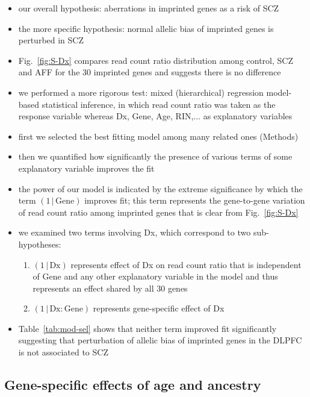 \documentclass[letterpaper]{article}
\begin{document}
\begin{itemize}
\item our overall hypothesis: aberrations in imprinted genes as a risk of
SCZ
\item the more specific hypothesis: normal allelic bias of imprinted genes is perturbed in SCZ
\item Fig.~\ref{fig:S-Dx} compares read count ratio distribution among
control, SCZ and AFF for the 30 imprinted genes and suggests there is no difference
\item we performed a more rigorous test: mixed (hierarchical) regression
model-based statistical inference,
in which read count ratio was taken as the response variable whereas Dx, Gene, Age, RIN,... as
explanatory variables
\item first we selected the best fitting model among many related ones (Methods)
\item then we quantified how significantly the presence
of various terms of some explanatory variable improves the fit
\item the power of our model is indicated by the extreme significance by
which the term \((1\,|\,\mathrm{Gene})\) improves fit; this term represents
the gene-to-gene variation of read count ratio among imprinted genes that is
clear from Fig.~\ref{fig:S-Dx}
\item we examined two terms involving Dx, which correspond to two
sub-hypotheses:
\begin{enumerate}
\item \((1\,|\,\mathrm{Dx})\) represents effect of Dx on read count ratio that
is independent of Gene and any other explanatory variable in the model and
thus represents an effect shared by all 30 genes
\item \((1\,|\,\mathrm{Dx}:\mathrm{Gene})\) represents gene-specific effect of
Dx 
\end{enumerate}
\item Table~\ref{tab:mod-sel} shows that neither term improved fit
significantly suggesting that perturbation of allelic bias of imprinted genes in the DLPFC
is not associated to SCZ
\end{itemize}

\subsection{Gene-specific effects of age and ancestry}
\end{document}
